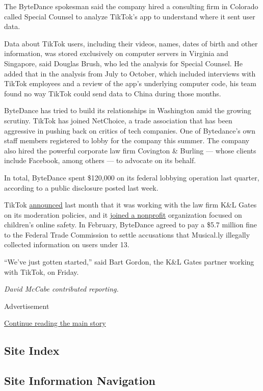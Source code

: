 The ByteDance spokesman said the company hired a consulting firm in
Colorado called Special Counsel to analyze TikTok's app to understand
where it sent user data.

Data about TikTok users, including their videos, names, dates of birth
and other information, was stored exclusively on computer servers in
Virginia and Singapore, said Douglas Brush, who led the analysis for
Special Counsel. He added that in the analysis from July to October,
which included interviews with TikTok employees and a review of the
app's underlying computer code, his team found no way TikTok could send
data to China during those months.

ByteDance has tried to build its relationships in Washington amid the
growing scrutiny. TikTok has joined NetChoice, a trade association that
has been aggressive in pushing back on critics of tech companies. One of
Bytedance's own staff members registered to lobby for the company this
summer. The company also hired the powerful corporate law firm Covington
\& Burling --- whose clients include Facebook, among others --- to
advocate on its behalf.

In total, ByteDance spent \$120,000 on its federal lobbying operation
last quarter, according to a public disclosure posted last week.

TikTok
\href{https://newsroom.tiktok.com/en-us/our-commitment-to-our-users-and-the-tik-tok-experience}{announced}
last month that it was working with the law firm K\&L Gates on its
moderation policies, and it
\href{https://www.fosi.org/about/press/fosi-welcomes-tiktok/}{joined a
nonprofit} organization focused on children's online safety. In
February, ByteDance agreed to pay a \$5.7 million fine to the Federal
Trade Commission to settle accusations that Musical.ly illegally
collected information on users under 13.

``We've just gotten started,'' said Bart Gordon, the K\&L Gates partner
working with TikTok, on Friday.

\emph{David McCabe contributed reporting.}

Advertisement

\protect\hyperlink{after-bottom}{Continue reading the main story}

\hypertarget{site-index}{%
\subsection{Site Index}\label{site-index}}

\hypertarget{site-information-navigation}{%
\subsection{Site Information
Navigation}\label{site-information-navigation}}

